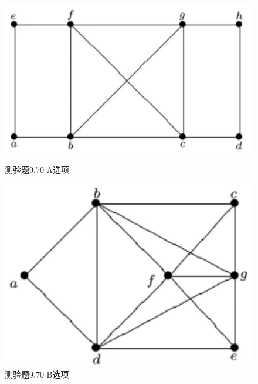 \documentclass[UTF8, heading=true]{ctexart}
\begin{document}
\begin{figure}[H]
  \centering
  \begin{minipage}[t]{0.35\textwidth}
      \centering
      \includegraphics[width=1\textwidth]{9.67_1.jpg} %
      \vspace{-0.3cm}
      \caption{测验题9.70 A选项}
  \end{minipage}
  \hspace{0.1\textwidth} %
  \begin{minipage}[t]{0.35\textwidth}
      \centering
      \includegraphics[width=1\textwidth]{9.67_2.jpg} %
      \vspace{-0.3cm}
      \caption{测验题9.70 B选项}
\end{minipage}
\end{figure}
\end{document}
